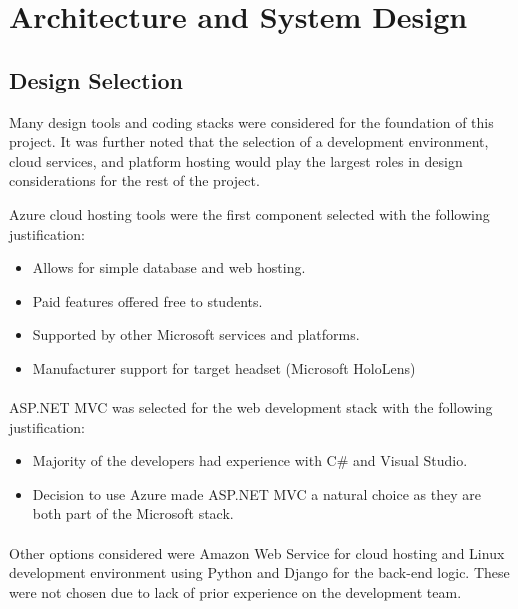  \section{Architecture and System Design}
 
   \subsection{Design Selection}
 Many design tools and coding stacks were considered for the foundation of this project. It was further noted that the selection of a development environment, cloud services, and platform hosting would play the largest roles in design considerations for the rest of the project. 
 
 Azure cloud hosting tools were the first component selected with the following justification: 

 \begin{itemize}
    \item Allows for simple database and web hosting.
    \item Paid features offered free to students.
    \item Supported by other Microsoft services and platforms. 
    \item Manufacturer support for target headset (Microsoft HoloLens)
 \end{itemize}
 
 \paragraph{}
 ASP.NET MVC was selected for the web development stack with the following justification:

\begin{itemize}
    \item Majority of the developers had experience with C\# and Visual Studio.
    \item Decision to use Azure made ASP.NET MVC a natural choice as they are both part of the Microsoft stack.
\end{itemize}

\paragraph{}
Other options considered were Amazon Web Service for cloud hosting and Linux development environment using Python and Django for the back-end logic. These were not chosen due to lack of prior experience on the development team. 

